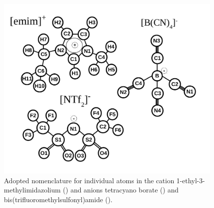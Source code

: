 \documentclass[3p,twocolumn]{elsarticle}
\begin{document}
\begin{figure}
\centering
\includegraphics[width=\linewidth]{atoms_id.pdf}
\caption{Adopted nomenclature for individual atoms in the cation 1-ethyl-3-methylimidazolium (\ce{[emim]^+}) and anions tetracyano borate (\ce{[B(CN)_4]^-}) and bis(trifluoromethylsulfonyl)amide (\ce{[NTf_2]^-}).}
\label{fig:atoms_id}
\end{figure}
\end{document}
